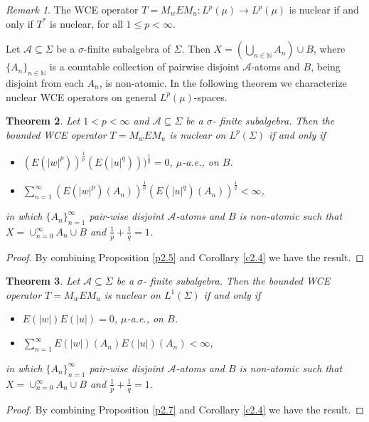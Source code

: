 \documentclass{amsart}
\newtheorem{thm}{Theorem}[section]
\theoremstyle{definition}\newtheorem{defn}[thm]{Definition}
\theoremstyle{remark}
\newtheorem{rem}[thm]{Remark}
\numberwithin{equation}{section}
\begin{document}
\begin{rem}
The WCE operator $T=M_wEM_u:L^p(\mu)\rightarrow L^p(\mu)$ is nuclear if and only if $T^*$ is nuclear, for all $1\leq p<\infty$.
\end{rem}

Let $\mathcal{A}\subseteq \Sigma$ be a $\sigma$-finite subalgebra of $\Sigma$. Then $X=\left (\bigcup_{n\in\mathbb{N}}A_n\right )\cup B$, where
$\{A_n\}_{n\in\mathbb{N}}$ is a countable collection of pairwise disjoint $\mathcal{A}$-atoms and $B$, being disjoint from each
$A_n$, is non-atomic. In the following theorem we characterize nuclear WCE operators on general $L^p(\mu)$-spaces.

  \begin{thm}\label{t2.10}
Let $1<p<\infty$ and $\mathcal{A}\subseteq \Sigma$ be a $\sigma$- finite subalgebra. Then the bounded WCE operator $T=M_wEM_u$ is nuclear on $L^p(\Sigma)$ if and only if
\begin{itemize}
  \item $(E(|w|^{p}))^{\frac{1}{p}}(E(|u|^{q})))^{\frac{1}{q}}=0$, $\mu$-a.e., on $B$. 
  \item $\sum^{\infty}_{n=1}(E(|w|^{p})(A_n))^{\frac{1}{p}}(E(|u|^{q})(A_n))^{\frac{1}{q}}<\infty$,
\end{itemize}
in which $\{A_n\}^{\infty}_{n=1}$ pair-wise disjoint $\mathcal{A}$-atoms and $B$ is non-atomic such that $X=\cup^{\infty}_{n=0}A_n\cup B$ and $\frac{1}{p}+\frac{1}{q}=1$.
\end{thm}
\begin{proof}
By combining Proposition \ref{p2.5} and Corollary \ref{c2.4} we have the result.
\end{proof}
\begin{thm}\label{t2.11}
Let $\mathcal{A}\subseteq \Sigma$ be a $\sigma$- finite subalgebra. Then the bounded WCE operator $T=M_wEM_u$ is nuclear on $L^1(\Sigma)$ if and only if
\begin{itemize}
  \item $E(|w|)E(|u|)=0$, $\mu$-a.e., on $B$.
  \item $\sum^{\infty}_{n=1}E(|w|)(A_n)E(|u|)(A_n)<\infty$,
\end{itemize}
in which $\{A_n\}^{\infty}_{n=1}$ pair-wise disjoint $\mathcal{A}$-atoms and $B$ is non-atomic such that $X=\cup^{\infty}_{n=0}A_n\cup B$ and $\frac{1}{p}+\frac{1}{q}=1$.
\end{thm}
\begin{proof}
By combining Proposition \ref{p2.7} and Corollary \ref{c2.4} we have the result.
\end{proof}
\end{document}
